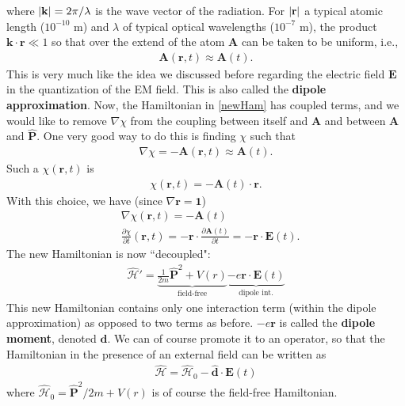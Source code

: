 \documentclass{book}
\theoremstyle{definition}
\newcommand{\p}{\partial}
\newcommand{\ham}{\mathcal{H}}
\newcommand{\f}[2]{\frac{#1}{#2}}
\begin{document}
where $\abs{\mathbf{k}} = 2\pi/\lambda$ is the wave vector of the radiation. For $\abs{\mathbf{r}}$ a typical atomic length ($10^{-10}$ m) and $\lambda$ of typical optical wavelengths ($10^{-7}$ m), the product $\mathbf{k}\cdot\mathbf{r} \ll 1$ so that over the extend of the atom $\mathbf{A}$ can be taken to be uniform, i.e.,
\begin{align}
\mathbf{A}(\mathbf{r},t) \approx \mathbf{A}(t).
\end{align} 
This is very much like the idea we discussed before regarding the electric field $\mathbf{E}$ in the quantization of the EM field. This is also called the \textbf{dipole approximation}. Now, the Hamiltonian in \eqref{newHam} has coupled terms, and we would like to remove $\nabla \chi$ from the coupling between itself and $\mathbf{A}$ and between $\mathbf{A}$ and $\hat{\mathbf{P}}$. One very good way to do this is finding $\chi$ such that
\begin{align}
\nabla \chi = - \mathbf{A}(\mathbf{r},t) \approx \mathbf{A}(t).
\end{align}
Such a $\chi(\mathbf{r},t)$ is
\begin{align}
\chi(\mathbf{r},t) = - \mathbf{A}(t)\cdot \mathbf{r}.
\end{align}
With this choice, we have (since $\nabla \mathbf{r} = \mathbf{1}$)
\begin{align}
&\nabla \chi(\mathbf{r},t) = -\mathbf{A}(t)\\
&\f{\p \chi}{\p t}(\mathbf{r},t) = -\mathbf{r}\cdot \f{\p \mathbf{A}(t)}{\p t} = -\mathbf{r}\cdot \mathbf{E}(t).
\end{align}
The new Hamiltonian is now ``decoupled":
\begin{align}
\boxed{\hat{\ham}' = \underbrace{\f{1}{2m}\hat{\mathbf{P}}^2 + V(r)}_{\text{field-free}} \underbrace{-e\mathbf{r}\cdot \mathbf{E}(t)}_{\text{dipole int.}}}
\end{align}
This new Hamiltonian contains only one interaction term (within the dipole approximation) as opposed to two terms as before. $-e\mathbf{r}$ is called the \textbf{dipole moment}, denoted $\mathbf{d}$. We can of course promote it to an operator, so that the Hamiltonian in the presence of an external field can be written as
\begin{align}
\boxed{\hat{\ham} = \hat{\ham}_0 - \hat{\mathbf{d}}\cdot\mathbf{E}(t)}
\end{align}
where $\hat{\ham}_0 = \hat{\mathbf{P}}^2/2m + V(r)$ is of course the field-free Hamiltonian. 
\end{document}
